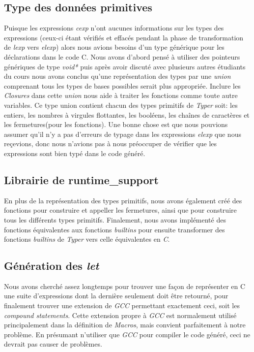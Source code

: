 \documentclass{article}
\begin{document}
\subsection{Type des données primitives}
Puisque les expressions \emph{cexp} n'ont aucunes informations sur les types
des expressions (ceux-ci étant vérifiés et effacés pendant la phase de 
transformation de \emph{lexp} vers \emph{elexp}) alors nous avions besoins d'un
type générique pour les déclarations dans le code C. Nous avons d'abord pensé à
utiliser des pointeurs génériques de type \emph{void*} puis après avoir discuté
avec plusieurs autres étudiants du cours nous avons conclus qu'une
représentation des types par une \emph{union} comprenant tous les types de bases
possibles serait plus appropriée. Inclure les \emph{Closures} dans cette
\emph{union} nous aide à traiter les fonctions comme toute autre variables.
Ce type union contient chacun des types primitifs de \emph{Typer} soit:
les entiers, les nombres à virgules flottantes, les booléens, les chaînes de
caractères et les fermetures(pour les fonctions). Une bonne chose est que nous
pouvions assumer qu'il n'y a pas d'erreurs de typage dans les expressions
\emph{elexp} que nous reçevions, donc nous n'avions pas à nous préoccuper de
vérifier que les expressions sont bien typé dans le code généré.

\subsection{Librairie de runtime\_support}
En plus de la représentation des types primitifs, nous avons également créé
des fonctions pour construire et appeller les fermetures, ainsi que pour
construire tous les différents types primitifs.
Finalement, nous avons implémenté des fonctions équivalentes aux fonctions
\textit{builtins} pour ensuite transformer des fonctions \textit{builtins}
de \emph{Typer} vers celle équivalentes en \emph{C}.

\subsection{Génération des \emph{let}}
Nous avons cherché assez longtemps pour trouver une façon de représenter en
C une suite d'expressions dont la dernière seulement doit être retourné, pour
finalement trouver une extension de \emph{GCC} permettant exactement ceci,
soit les \emph{compound statements}\cite{gnu_statexprs}. Cette extension propre
à \emph{GCC} est normalement utilisé principalement dans la définition de
\emph{Macros}, mais convient parfaitement à notre problème. En présumant
n'utiliser que \emph{GCC} pour compiler le code généré, ceci ne devrait pas
causer de problèmes.
\end{document}
